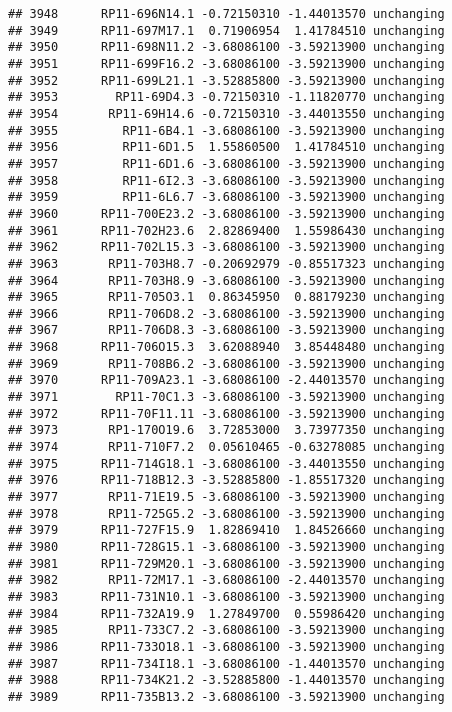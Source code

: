 \documentclass[]{article}
\begin{document}
\begin{verbatim}
## 3948      RP11-696N14.1 -0.72150310 -1.44013570 unchanging
## 3949      RP11-697M17.1  0.71906954  1.41784510 unchanging
## 3950      RP11-698N11.2 -3.68086100 -3.59213900 unchanging
## 3951      RP11-699F16.2 -3.68086100 -3.59213900 unchanging
## 3952      RP11-699L21.1 -3.52885800 -3.59213900 unchanging
## 3953        RP11-69D4.3 -0.72150310 -1.11820770 unchanging
## 3954       RP11-69H14.6 -0.72150310 -3.44013550 unchanging
## 3955         RP11-6B4.1 -3.68086100 -3.59213900 unchanging
## 3956         RP11-6D1.5  1.55860500  1.41784510 unchanging
## 3957         RP11-6D1.6 -3.68086100 -3.59213900 unchanging
## 3958         RP11-6I2.3 -3.68086100 -3.59213900 unchanging
## 3959         RP11-6L6.7 -3.68086100 -3.59213900 unchanging
## 3960      RP11-700E23.2 -3.68086100 -3.59213900 unchanging
## 3961      RP11-702H23.6  2.82869400  1.55986430 unchanging
## 3962      RP11-702L15.3 -3.68086100 -3.59213900 unchanging
## 3963       RP11-703H8.7 -0.20692979 -0.85517323 unchanging
## 3964       RP11-703H8.9 -3.68086100 -3.59213900 unchanging
## 3965       RP11-705O3.1  0.86345950  0.88179230 unchanging
## 3966       RP11-706D8.2 -3.68086100 -3.59213900 unchanging
## 3967       RP11-706D8.3 -3.68086100 -3.59213900 unchanging
## 3968      RP11-706O15.3  3.62088940  3.85448480 unchanging
## 3969       RP11-708B6.2 -3.68086100 -3.59213900 unchanging
## 3970      RP11-709A23.1 -3.68086100 -2.44013570 unchanging
## 3971        RP11-70C1.3 -3.68086100 -3.59213900 unchanging
## 3972      RP11-70F11.11 -3.68086100 -3.59213900 unchanging
## 3973       RP1-170O19.6  3.72853000  3.73977350 unchanging
## 3974       RP11-710F7.2  0.05610465 -0.63278085 unchanging
## 3975      RP11-714G18.1 -3.68086100 -3.44013550 unchanging
## 3976      RP11-718B12.3 -3.52885800 -1.85517320 unchanging
## 3977       RP11-71E19.5 -3.68086100 -3.59213900 unchanging
## 3978       RP11-725G5.2 -3.68086100 -3.59213900 unchanging
## 3979      RP11-727F15.9  1.82869410  1.84526660 unchanging
## 3980      RP11-728G15.1 -3.68086100 -3.59213900 unchanging
## 3981      RP11-729M20.1 -3.68086100 -3.59213900 unchanging
## 3982       RP11-72M17.1 -3.68086100 -2.44013570 unchanging
## 3983      RP11-731N10.1 -3.68086100 -3.59213900 unchanging
## 3984      RP11-732A19.9  1.27849700  0.55986420 unchanging
## 3985       RP11-733C7.2 -3.68086100 -3.59213900 unchanging
## 3986      RP11-733O18.1 -3.68086100 -3.59213900 unchanging
## 3987      RP11-734I18.1 -3.68086100 -1.44013570 unchanging
## 3988      RP11-734K21.2 -3.52885800 -1.44013570 unchanging
## 3989      RP11-735B13.2 -3.68086100 -3.59213900 unchanging

\end{verbatim}
\end{document}

